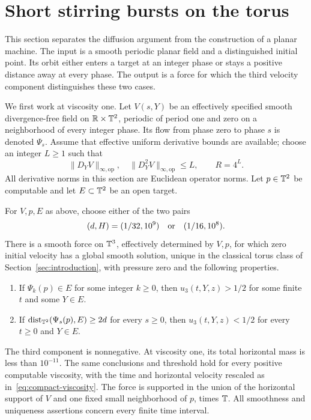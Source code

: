 \section{Short stirring bursts on the torus}\label{sec:compact}

This section separates the diffusion argument from the construction of
a planar machine. The input is a smooth periodic planar field and a
distinguished initial point. Its orbit either enters a target at an
integer phase or stays a positive distance away at every phase. The
output is a force for which the third velocity component distinguishes
these two cases.

We first work at viscosity one. Let $V(s,Y)$ be an effectively specified
smooth divergence-free field on $\mathbb R\times\mathbb T^2$, periodic of period one
and zero on a neighborhood of every integer phase. Its flow from phase
zero to phase $s$ is denoted $\Psi_s$. Assume that effective uniform
derivative bounds are available; choose an integer $L\ge1$ such that
\begin{equation}\label{eq:processor-derivatives}
 \|D_YV\|_{\infty,\mathrm{op}},\quad
 \|D_Y^2V\|_{\infty,\mathrm{op}}\le L,
 \qquad R=4^L.
\end{equation}
All derivative norms in this section are Euclidean operator norms.
Let $p\in\mathbb T^2$ be computable and let $E\subset\mathbb T^2$ be an open target.

\begin{theorem}\label{thm:compact-detector}
For $V,p,E$ as above, choose either of the two pairs
\begin{equation}\label{eq:two-constants}
 (d,H)=(1/32,10^9)\quad\hbox{or}\quad(1/16,10^8).
\end{equation}
There is a smooth force on $\mathbb T^3$, effectively determined by $V,p$,
for which zero initial
velocity has a global smooth solution, unique in the classical torus
class of Section~\ref{sec:introduction}, with pressure zero and
the following properties.
\begin{enumerate}
\item If $\Psi_k(p)\in E$ for some integer $k\ge0$, then
$u_3(t,Y,z)>1/2$ for some finite $t$ and some $Y\in E$.
\item If $\operatorname{dist}_{\mathbb T^2}(\Psi_s(p),E)\ge2d$ for every $s\ge0$,
then $u_3(t,Y,z)<1/2$ for every $t\ge0$ and $Y\in E$.
\end{enumerate}
The third component is nonnegative. At viscosity one, its total
horizontal mass is less than $10^{-11}$. The same conclusions and
threshold hold for every positive computable viscosity, with the time
and horizontal velocity rescaled as in~\eqref{eq:compact-viscosity}.
The force is supported in the union of the horizontal support of $V$
and one fixed small neighborhood of $p$, times $\mathbb T$. All smoothness and
uniqueness assertions concern every finite time interval.
\end{theorem}

